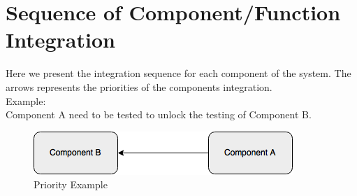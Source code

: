 \documentclass[../../../../testPlan.tex]{subfiles}
\begin{document}
	\section{Sequence of Component/Function Integration}
		Here we present the integration sequence for each component of the system.
		The arrows represents the priorities of the components integration.\\
		Example:\\
		Component A need to be tested to unlock the testing of Component B.

		\begin{figure}[H]
				\centering
				\includegraphics[width=\textwidth, scale=0.5]{../images/priority_example.png}
			\caption{Priority Example}\label{fig:PriorityExample}
		\end{figure}

		

		
\end{document}
